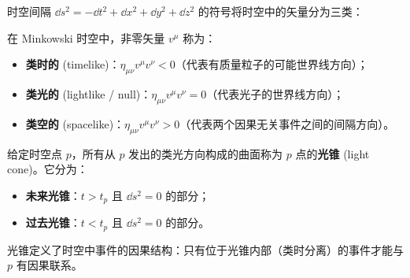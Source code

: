 时空间隔 $\dd s^2 = -\dd t^2 + \dd x^2 + \dd y^2 + \dd z^2$ 的符号将时空中的矢量分为三类：

\begin{definition}[矢量分类]
在 Minkowski 时空中，非零矢量 $v^\mu$ 称为：
\begin{itemize}
    \item \textbf{类时的} (timelike)：$\eta_{\mu\nu} v^\mu v^\nu < 0$（代表有质量粒子的可能世界线方向）；
    \item \textbf{类光的} (lightlike / null)：$\eta_{\mu\nu} v^\mu v^\nu = 0$（代表光子的世界线方向）；
    \item \textbf{类空的} (spacelike)：$\eta_{\mu\nu} v^\mu v^\nu > 0$（代表两个因果无关事件之间的间隔方向）。
\end{itemize}
\end{definition}

\begin{definition}[光锥]
给定时空点 $p$，所有从 $p$ 发出的类光方向构成的曲面称为 $p$ 点的\textbf{光锥} (light cone)。它分为：
\begin{itemize}
    \item \textbf{未来光锥}：$t > t_p$ 且 $\dd s^2 = 0$ 的部分；
    \item \textbf{过去光锥}：$t < t_p$ 且 $\dd s^2 = 0$ 的部分。
\end{itemize}
光锥定义了时空中事件的因果结构：只有位于光锥内部（类时分离）的事件才能与 $p$ 有因果联系。
\end{definition}

